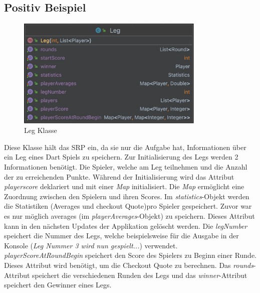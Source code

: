 \subsection{Positiv Beispiel}
\begin{figure}[ht]
    \centering
    \includegraphics[width=0.8\textwidth]{Bilder/Leg.png}
    \caption{Leg Klasse}
    \label{fig:leg-uml}
\end{figure}
Diese Klasse hält das SRP ein, da sie nur die Aufgabe hat, Informationen über ein Leg eines Dart Spiels zu speichern. Zur Initialisierung des Legs werden 2 Informationen benötigt. Die Spieler, welche am Leg teilnehmen und die Anzahl der zu erreichenden Punkte. Während der Initialisierung wird das Attribut \textit{playerscore} deklariert und mit einer \textit{Map} initialisiert. Die \textit{Map} ermöglicht eine Zuordnung zwischen den Spielern und ihren Scores. Im \textit{statistics}-Objekt werden die Statistiken (Averages und checkout Quote)pro Spieler gespeichert. Zuvor war es nur möglich averages (im \textit{playerAverages}-Objekt) zu speichern. Dieses Attribut kann in den nächsten Updates der Applikation gelöscht werden. Die \textit{legNumber} speichert die Nummer des Legs, welche beispielsweise für die Ausgabe in der Konsole (\textit{Leg Nummer 3 wird nun gespielt...}) verwendet. \textit{playerScoreAtRoundBegin} speichert den Score des Spielers zu Beginn einer Runde. Dieses Attribut wird benötigt, um die Checkout Quote zu berechnen. Das \textit{rounds}-Attribut speichert die verschiedenen Runden des Legs und das \textit{winner}-Attribut speichert den Gewinner eines Legs.
